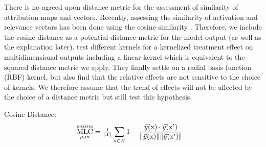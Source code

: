 There is no agreed upon distance metric for the assessment of similarity of attribution maps and vectors. 
Recently, assessing the similarity of activation and relevance vectors has been done using the cosine similarity \cite{Sixt2020,Achtibat2023,Dreyer2023a, Pahde2023}. Therefore, we include the cosine distance as a potential distance metric for the model output (as well as the explanation later). \cite{Karimi2023} test different kernels for a kernelized treatment effect on multidimensional outputs including a linear kernel which is equivalent to the squared distance metric we apply. They finally settle on a radial basis function (RBF) kernel, but also find that the relative effects are not sensitive to the choice of kernels. 
We therefore assume that the trend of effects will not be affected by the choice of a distance metric but still test this hypothesis.

Cosine Distance:
\begin{align}\displaystyle 
& \operatorname*{MLC}_{\rho, m}^{cosine} = \tfrac{1}{|\mathcal{X}|}\sum_{\mathrm{x} \in \mathcal{X}}  
1 - \frac{\vec{y}(\mathrm{x}) \cdot \vec{y}(\mathrm{x'})}
{\lVert \vec{y}(\mathrm{x}) \rVert \lVert \vec{y}(\mathrm{x'})\rVert }
\end{align}

